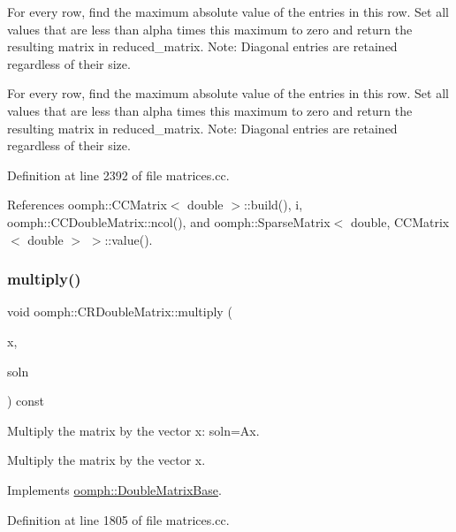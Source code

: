 For every row, find the maximum absolute value of the entries in this row. Set all values that are less than alpha times this maximum to zero and return the resulting matrix in reduced\+\_\+matrix. Note\+: Diagonal entries are retained regardless of their size. 

For every row, find the maximum absolute value of the entries in this row. Set all values that are less than alpha times this maximum to zero and return the resulting matrix in reduced\+\_\+matrix. Note\+: Diagonal entries are retained regardless of their size. 

Definition at line 2392 of file matrices.\+cc.



References oomph\+::\+C\+C\+Matrix$<$ double $>$\+::build(), i, oomph\+::\+C\+C\+Double\+Matrix\+::ncol(), and oomph\+::\+Sparse\+Matrix$<$ double, C\+C\+Matrix$<$ double $>$ $>$\+::value().

\mbox{\label{classoomph_1_1CRDoubleMatrix_a54b75960df52e3aebd21aaab20e9869d}} 
\subsubsection{\texorpdfstring{multiply()}{multiply()}\hspace{0.1cm}{\footnotesize\ttfamily [1/2]}}
{\footnotesize\ttfamily void oomph\+::\+C\+R\+Double\+Matrix\+::multiply (\begin{DoxyParamCaption}\item[{const \hyperlink{classoomph_1_1DoubleVector}{Double\+Vector} \&}]{x,  }\item[{\hyperlink{classoomph_1_1DoubleVector}{Double\+Vector} \&}]{soln }\end{DoxyParamCaption}) const\hspace{0.3cm}{\ttfamily [virtual]}}



Multiply the matrix by the vector x\+: soln=Ax. 

Multiply the matrix by the vector x. 

Implements \hyperlink{classoomph_1_1DoubleMatrixBase_a78204eab557e0dc99618e41a28a5c092}{oomph\+::\+Double\+Matrix\+Base}.



Definition at line 1805 of file matrices.\+cc.




